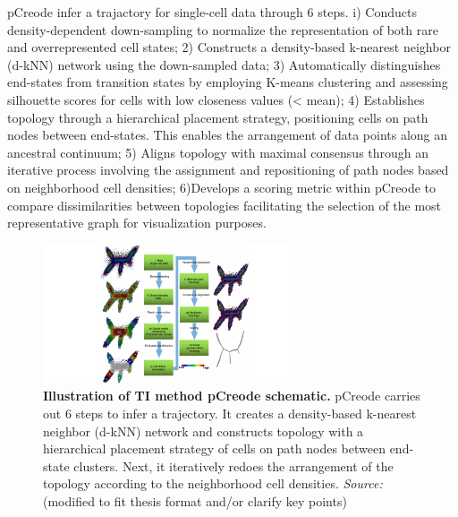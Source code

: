 \begin{description}
    pCreode infer a trajactory for single-cell data through 6 steps\citep{herring2018pCreode}. i) Conducts density-dependent down-sampling to normalize the representation of both rare and overrepresented cell states; 2) Constructs a density-based k-nearest neighbor (d-kNN) network using the down-sampled data; 3) Automatically distinguishes end-states from transition states by employing K-means clustering and assessing silhouette scores for cells with low closeness values (< mean); 4) Establishes topology through a hierarchical placement strategy, positioning cells on path nodes between end-states. This enables the arrangement of data points along an ancestral continuum; 5) Aligns topology with maximal consensus through an iterative process involving the assignment and repositioning of path nodes based on neighborhood cell densities; 6)Develops a scoring metric within pCreode to compare dissimilarities between topologies facilitating the selection of the most representative graph for visualization purposes.
    \begin{figure}[ht!]
    	\centering
    	\includegraphics[width=0.65\textwidth]{TI_Alg_pCreode/fig}
    	\vspace{0.1cm}
    	\caption[Illustration of TI method pCreode schematic.]{\textbf{Illustration of TI method pCreode schematic.} pCreode carries out 6 steps to infer a trajectory. It creates a density-based k-nearest neighbor (d-kNN) network and constructs topology with a hierarchical placement strategy of cells on path nodes between end-state clusters. Next, it iteratively redoes the arrangement of the topology according to the neighborhood cell densities. \emph{Source: ~\cite{herring2018pCreode}} (modified to fit thesis format and/or clarify key points)
    	}
    	\label{fig:TI_Alg_pCreode}
    \end{figure}    


\end{description}
